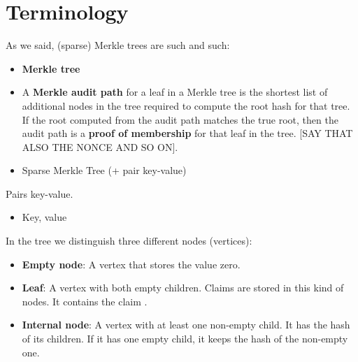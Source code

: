 \documentclass[11pt]{article}
\begin{document}

	
\section{Terminology}				%

As we said, (sparse) Merkle trees are such and such:
\begin{itemize}
	\item {\bf Merkle tree}
	\item A {\bf Merkle audit path} for a leaf in a Merkle tree is the shortest list of additional nodes in the tree required to compute the root hash for that tree.\\
	
	If the root computed from the audit path matches the true root, then the audit path is a {\bf proof of membership} for that leaf in the tree. [SAY THAT ALSO THE NONCE AND SO ON].
	\item Sparse Merkle Tree (+ pair key-value)
\end{itemize}

Pairs key-value.
\begin{itemize}
	\item Key, value
\end{itemize}

In the tree we distinguish three different nodes (vertices):
\begin{itemize}
	\item {\bf Empty node}: A vertex that stores the value zero.
	\item {\bf Leaf}: A vertex with both empty children. Claims are stored in this kind of nodes. 
	It contains the claim {\color{blue}{i com guarda el key-value (la info que es vol guardar), amb el 1 aquell}}.
	\item {\bf Internal node}: A vertex with at least one non-empty child. It has the hash of its children. If it has one empty child, it keeps the hash of the non-empty one. %
\end{itemize}
\end{document}
